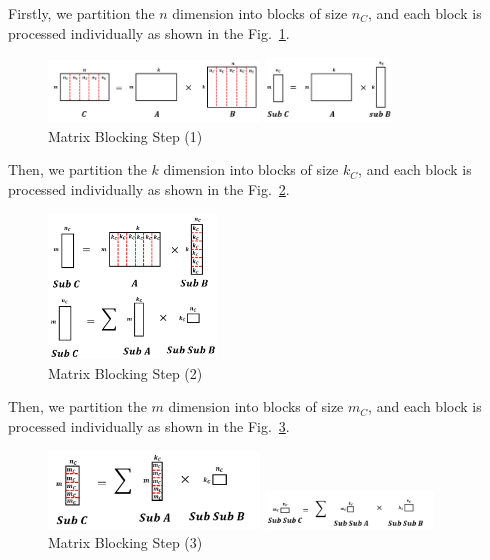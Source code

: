 \documentclass[conference]{IEEEtran}
\begin{document}
 	Firstly, we partition the $n$ dimension into blocks of size $n_C$, and each block is processed individually as shown in the Fig.~\ref{matrixBlockingStep1}.
 	
	\begin{figure}[htbp]
		\centerline{\includegraphics[width=0.5\textwidth]{fig3.png}}
		\centerline{\includegraphics[width=0.3\textwidth]{fig3-2.png}}
		\caption{Matrix Blocking Step (1)}
		\label{matrixBlockingStep1}
	\end{figure} 

 	Then, we partition the $k$ dimension into blocks of size $k_C$, and each block is processed individually as shown in the Fig.~\ref{matrixBlockingStep2}.
	
	\begin{figure}[htbp]
		\centerline{\includegraphics[width=0.4\textwidth]{fig4.png}}
		\caption{Matrix Blocking Step (2)}
		\label{matrixBlockingStep2}
	\end{figure}

 	Then, we partition the $m$ dimension into blocks of size $m_C$, and each block is processed individually as shown in the Fig.~\ref{matrixBlockingStep3}.
 	
	\begin{figure}[htbp]
	\centerline{\includegraphics[width=0.5\textwidth]{fig5.png}}
	\centerline{\includegraphics[width=0.4\textwidth]{fig5-2.png}}
	\caption{Matrix Blocking Step (3)}
	\label{matrixBlockingStep3}
	\end{figure}
\end{document}
